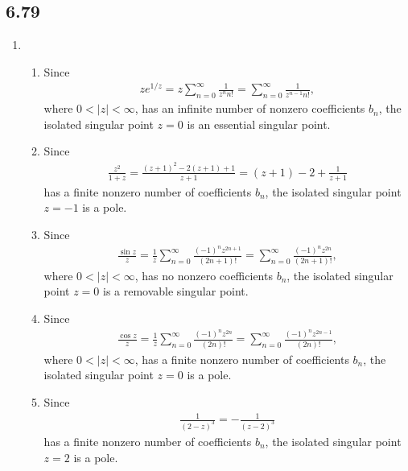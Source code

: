 \documentclass[a4paper,12pt]{article}
\begin{document}
\subsection*{6.79}
\begin{enumerate}
    \item
        \begin{enumerate}
            \item
                Since
                \begin{align*}
                    z e^{1/z} = z \sum_{n = 0}^\infty \frac{1}{z^n n!} = \sum_{n = 0}^\infty \frac{1}{z^{n - 1} n!},
                \end{align*}
                where $0 < |z| < \infty$, has an infinite number of nonzero coefficients $b_n$, the isolated singular point $z = 0$ is an essential singular point.

            \item
                Since
                \begin{align*}
                    \frac{z^2}{1 + z} = \frac{(z + 1)^2 - 2(z + 1) + 1}{z + 1} = (z + 1) - 2 + \frac{1}{z + 1}
                \end{align*}
                has a finite nonzero number of coefficients $b_n$, the isolated singular point $z = -1$ is a pole.

            \item
                Since
                \begin{align*}
                    \frac{\sin z}{z} = \frac{1}{z} \sum_{n = 0}^\infty \frac{(-1)^n z^{2n + 1}}{(2n + 1)!} = \sum_{n = 0}^\infty \frac{(-1)^n z^{2n}}{(2n + 1)!},
                \end{align*}
                where $0 < |z| < \infty$, has no nonzero coefficients $b_n$, the isolated singular point $z = 0$ is a removable singular point.

            \item
                Since
                \begin{align*}
                    \frac{\cos z}{z} = \frac{1}{z} \sum_{n = 0}^\infty \frac{(-1)^n z^{2n}}{(2n)!} = \sum_{n = 0}^\infty \frac{(-1)^n z^{2n - 1}}{(2n)!},
                \end{align*}
                where $0 < |z| < \infty$, has a finite nonzero number of coefficients $b_n$, the isolated singular point $z = 0$ is a pole.

            \item
                Since
                \begin{align*}
                    \frac{1}{(2 - z)^3} = -\frac{1}{(z - 2)^3}
                \end{align*}
                has a finite nonzero number of coefficients $b_n$, the isolated singular point $z = 2$ is a pole.
        \end{enumerate}


\end{enumerate}
\end{document}
